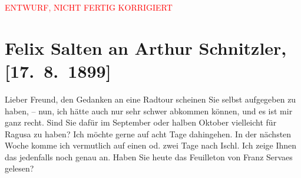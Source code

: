 
\begin{center}
            \textcolor{red}{ENTWURF, NICHT FERTIG KORRIGIERT}
                      \end{center}
            
         
         \renewcommand{\erwaehntePersonen}{Personen: Richard Beer-Hofmann, Houston Stewart Chamberlain, Ottilie Salten, Franz Servaes, Karl von Thaler}
         \renewcommand{\erwaehnteInstitutionen}{Institutionen: Neue Freie Presse}
         \renewcommand{\erwaehnteOrte}{Orte: Bad Ischl, Dubrovnik}
         \renewcommand{\erwaehnteWerke}{Werke: Decadence-Romane, Die Grundlagen des neunzehnten Jahrhunderts, Neue Freie Presse}
               \section[Felix Salten an Arthur Schnitzler, {[}17. 8. 1899{]}]{ Felix Salten an Arthur Schnitzler, {[}17. 8. 1899{]}}\nopagebreak{}\rehead{ }\begin{ledgroupsized}[t]{13cm}\normalsize\beginnumbering \toendnotes[C]{\smallbreak\pagebreak[2]} 
\toendnotes[C]{\smallbreak}\pstart
           \noindent{}{\pb}Lieber Freund, den Gedanken an eine Radtour scheinen Sie selbst
               aufgegeben zu haben, – nun, ich hätte auch nur sehr schwer abkommen können, und es
               ist mir ganz recht. Sind Sie dafür im September oder halben Oktober vielleicht für
                  Ragusa zu haben? Ich möchte gerne auf acht
               Tage dahingehen. In der nächsten Woche komme ich vermutlich auf einen od. zwei Tage
               nach Ischl. Ich zeige Ihnen das jedenfalls noch
               genau an. Haben Sie heute das Feuilleton von Franz Servaes gelesen?

\end{ledgroupsized}
